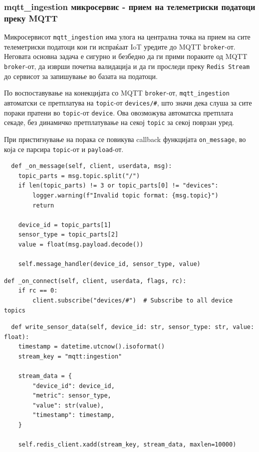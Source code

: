 \subsubsection{mqtt\_ingestion микросервис - прием на телеметриски податоци преку MQTT}

Микросервисот \texttt{mqtt\_ingestion} има улога на централна точка на прием на
сите телеметриски податоци кои ги испраќаат IoT уредите до MQTT
\texttt{broker}-от. Неговата основна задача е сигурно и безбедно да ги прими
пораките од MQTT \texttt{broker}-от, да изврши почетна валидација и да ги
проследи преку \texttt{Redis Stream} до сервисот за запишување во базата на
податоци.

По воспоставување на конекцијата со MQTT \texttt{broker}-от, \texttt{mqtt\_ingestion} автоматски се претплатува на \texttt{topic}-от \texttt{devices/\#}, што значи дека слуша
за сите пораки пратени во \texttt{topic}-от \texttt{device}. Ова овозможува автоматска
претплата секаде, без динамичко претплатување на секој \texttt{topic} за секој
поврзан уред.

При пристигнување на порака се повикува callback функцијата \texttt{on\_message},
во која се парсира \texttt{topic}-от и \texttt{payload}-от.

\begin{verbatim}
  def _on_message(self, client, userdata, msg):
    topic_parts = msg.topic.split("/")
    if len(topic_parts) != 3 or topic_parts[0] != "devices":
        logger.warning(f"Invalid topic format: {msg.topic}")
        return

    device_id = topic_parts[1]
    sensor_type = topic_parts[2]
    value = float(msg.payload.decode())
    
    self.message_handler(device_id, sensor_type, value)
\end{verbatim}

\begin{verbatim}
def _on_connect(self, client, userdata, flags, rc):
    if rc == 0:
        client.subscribe("devices/#")  # Subscribe to all device topics
\end{verbatim}

\begin{verbatim}
  def write_sensor_data(self, device_id: str, sensor_type: str, value: float):
    timestamp = datetime.utcnow().isoformat()
    stream_key = "mqtt:ingestion"
    
    stream_data = {
        "device_id": device_id,
        "metric": sensor_type,
        "value": str(value),
        "timestamp": timestamp,
    }
    
    self.redis_client.xadd(stream_key, stream_data, maxlen=10000)
\end{verbatim}

